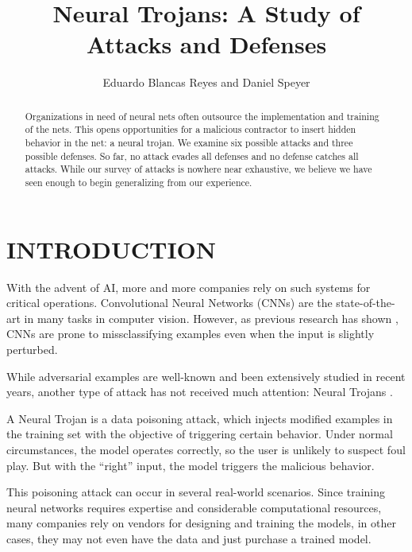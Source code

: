 \documentclass[letterpaper, 10 pt, conference]{ieeeconf}  %
\title{\LARGE \bf
Neural Trojans: A Study of Attacks and Defenses
}
\author{Eduardo Blancas Reyes and Daniel Speyer%
}
\begin{document}
\maketitle
\thispagestyle{empty}
\pagestyle{empty}


\begin{abstract}

Organizations in need of neural nets often outsource the
implementation and training of the nets.  This opens opportunities for
a malicious contractor to insert hidden behavior in the net: a neural
trojan.  We examine six possible attacks and three possible defenses.
So far, no attack evades all defenses and no defense catches all
attacks.  While our survey of attacks is nowhere near exhaustive, we
believe we have seen enough to begin generalizing from our experience.
  
\end{abstract}


\section{INTRODUCTION}

With the advent of AI, more and more companies rely on such systems for critical operations. Convolutional Neural Networks (CNNs) are the state-of-the-art in many tasks in computer vision. However, as previous research has shown \cite{adversarial, adversarial2}, CNNs are prone to missclassifying examples even when the input is slightly perturbed.

While adversarial examples are well-known and been extensively studied in recent years, another type of attack has not received much attention: Neural Trojans \cite{trojan, trojan2}.

A Neural Trojan is a data poisoning attack, which injects modified examples in the training set with the objective of triggering certain behavior.  Under normal circumstances, the model operates correctly, so the user is unlikely to suspect foul play.  But with the ``right'' input, the model triggers the malicious behavior.

This poisoning attack can occur in several real-world scenarios. Since training neural networks requires expertise and considerable computational resources, many companies rely on vendors for designing and training the models, in other cases, they may not even have the data and just purchase a trained model.
\end{document}
